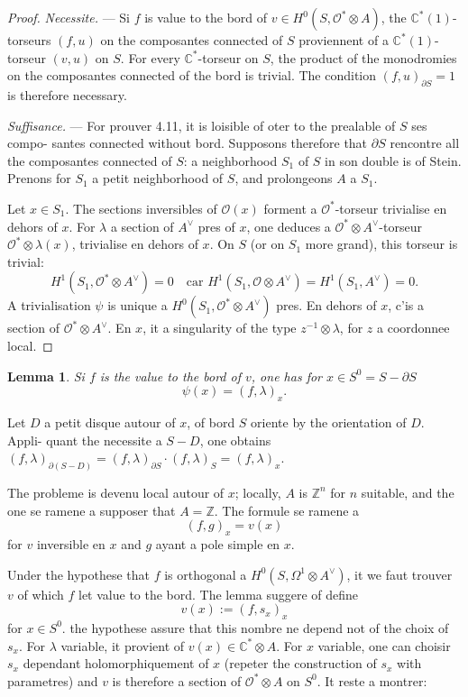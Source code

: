 \documentclass[12pt,a4paper]{article}
\theoremstyle{plain}
\newtheorem{lemma}[theorem]{Lemma}
\theoremstyle{definition}
\theoremstyle{remark}
\newcommand{\cO}{\mathcal{O}}
\newcommand{\Z}{\mathbb{Z}}
\newcommand{\C}{\mathbb{C}}
\providecommand{\cO}{\mathcal{O}}
\begin{document}
\begin{proof}[Proof]
\textit{Necessite.} --- Si $f$ is value to the bord of $v \in H^0(S, \cO^* \otimes A)$, the $\C^*(1)$-torseurs
$(f, u)$ on the composantes connected of $S$ proviennent of a $\C^*(1)$-torseur $(v, u)$ on $S$.
For every $\C^*$-torseur on $S$, the product of the monodromies on the composantes connected
of the bord is trivial. The condition $(f, u)_{\partial S} = 1$ is therefore necessary.

\textit{Suffisance.} --- For prouver 4.11, it is loisible of oter to the prealable of $S$ ses compo-
santes connected without bord. Supposons therefore that $\partial S$ rencontre all the composantes
connected of $S$: a neighborhood $S_1$ of $S$ in son double is of Stein. Prenons for $S_1$
a petit neighborhood of $S$, and prolongeons $A$ a $S_1$.

Let $x \in S_1$. The sections inversibles of $\cO(x)$ forment a $\cO^*$-torseur trivialise en
dehors of $x$. For $\lambda$ a section of $A^\vee$ pres of $x$, one deduces a $\cO^* \otimes A^\vee$-torseur $\cO^* \otimes \lambda(x)$,
trivialise en dehors of $x$. On $S$ (or on $S_1$ more grand), this torseur is trivial:
\[
H^1(S_1, \cO^* \otimes A^\vee) = 0 \quad \text{car } H^1(S_1, \cO \otimes A^\vee) = H^1(S_1, A^\vee) = 0.
\]
A trivialisation $\psi$ is unique a $H^0(S_1, \cO^* \otimes A^\vee)$ pres. En dehors of $x$, c'is a section
of $\cO^* \otimes A^\vee$. En $x$, it a singularity of the type $z^{-1} \otimes \lambda$, for $z$ a coordonnee local.
\end{proof}

\begin{lemma}
Si $f$ is the value to the bord of $v$, one has for $x \in S^0 = S - \partial S$
\[
\psi(x) = (f, \lambda)_x.
\]
\end{lemma}

Let $D$ a petit disque autour of $x$, of bord $S$ oriente by the orientation of $D$. Appli-
quant the necessite a $S - D$, one obtains $(f, \lambda)_{\partial(S-D)} = (f, \lambda)_{\partial S} \cdot (f, \lambda)_S = (f, \lambda)_x$.

The probleme is devenu local autour of $x$; locally, $A$ is $\Z^n$ for $n$ suitable, and
the one se ramene a supposer that $A = \Z$. The formule se ramene a
\[
(f, g)_x = v(x)
\]
for $v$ inversible en $x$ and $g$ ayant a pole simple en $x$.

Under the hypothese that $f$ is orthogonal a $H^0(S, \Omega^1 \otimes A^\vee)$, it we faut trouver $v$
of which $f$ let value to the bord. The lemma suggere of define
\[
v(x) := (f, s_x)_x
\]
for $x \in S^0$. the hypothese assure that this nombre ne depend not of the choix of $s_x$. For
$\lambda$ variable, it provient of $v(x) \in \C^* \otimes A$. For $x$ variable, one can choisir $s_x$ dependant
holomorphiquement of $x$ (repeter the construction of $s_x$ with parametres) and $v$ is therefore
a section of $\cO^* \otimes A$ on $S^0$. It reste a montrer:
\end{document}
